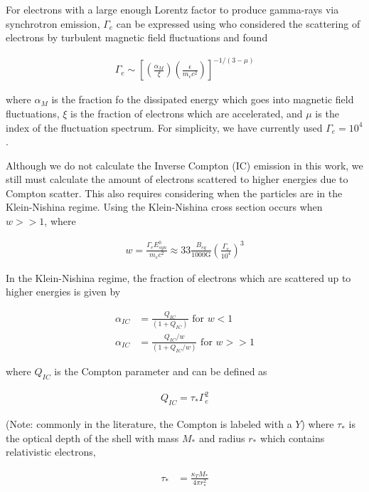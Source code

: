 \documentclass[linenumbers,twocolumn]{aastex631}
\begin{document}
For electrons with a large enough Lorentz factor to produce gamma-rays via synchrotron emission, $\Gamma_e$ can be expressed using \citet{1996ApJ...461L..37B} who considered the scattering of electrons by turbulent magnetic field fluctuations and found 

\begin{align}
	\Gamma_e \sim \left[ \left(\frac{\alpha_M}{\xi}\right)\left(\frac{\epsilon}{m_ec^2}\right) \right]^{-1/(3-\mu)}
\end{align}

where $\alpha_M$ is the fraction fo the dissipated energy which goes into magnetic field fluctuations, $\xi$ is the fraction of electrons which are accelerated, and $\mu$ is the index of the fluctuation spectrum. For simplicity, we have currently used $\Gamma_e=10^4$.

Although we do not calculate the Inverse Compton (IC) emission in this work, we still must calculate the amount of electrons scattered to higher energies due to Compton scatter. This also requires considering when the particles are in the Klein-Nishina regime. Using the Klein-Nishina cross section occurs when $w>>1$, where

\begin{align}
	w = \frac{\Gamma_e E_{syn}^0}{m_e c^2} \approx 33 \frac{B_{eq}}{1000\text{G}}\left(\frac{\Gamma_e}{10^4}\right)^3
\end{align}

In the Klein-Nishina regime, the fraction of electrons which are scattered up to higher energies is given by 

\begin{align}
	\alpha_{IC} &= \frac{Q_{IC}}{(1+Q_{IC})} \text{ for } w < 1 \\
	\alpha_{IC} &= \frac{Q_{IC}/w}{(1+Q_{IC}/w)} \text{ for } w >> 1 
\end{align}

where $Q_{IC}$ is the Compton parameter and can be defined as 

\begin{align}
	Q_{IC} = \tau_{*}\Gamma_e^2
\end{align}

(Note: commonly in the literature, the Compton is labeled with a $Y$) where $\tau_{*}$ is the optical depth of the shell with mass $M_{*}$ and radius $r_{*}$ which contains relativistic electrons, 

\begin{align} \label{eq: QIC p1}
	\tau_{*} &= \frac{\kappa_T M_{*}}{4 \pi r_{*}^2}
\end{align}
\end{document}
